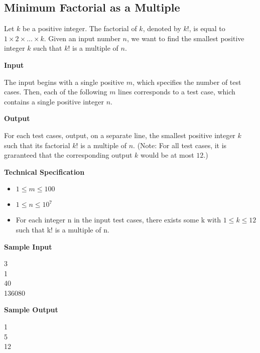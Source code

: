 \subsection{Minimum Factorial as a Multiple}
Let $k$ be a positive integer. The factorial of $k$, denoted by $k!$, is equal to $1 \times 2 \times ... \times k$. Given an input number $n$, we want to find the smallest positive integer $k$ such that $k!$ is a multiple of $n$.

\begin{flushleft}
{\color{red} \textbf{Input}}
\end{flushleft}
The input begins with a single positive $m$, which specifies the number of test cases. Then, each of the following $m$ lines corresponds to a test case, which contains a single positive integer $n$.

\begin{flushleft}
{\color{red} \textbf{Output}}
\end{flushleft}
For each test cases, output, on a separate line, the smallest positive integer $k$ such that its factorial $k!$ is a multiple of $n$. (Note: For all test cases, it is graranteed that the corresponding output $k$ would be at most $12$.)

\begin{flushleft}
{\color{red} \textbf{Technical Specification}}
\end{flushleft}
\begin{itemize}
\item $1 \leq m \leq 100$
\item $1 \leq n \leq 10^7$
\item For each integer n in the input test cases, there exists some k with $1 \leq k \leq 12$ such that k! is a multiple of n.
\end{itemize}

\begin{flushleft}
{\color{red} \textbf{Sample Input}}
\end{flushleft}
\begin{flushleft}
3\\
1\\
40\\
136080\\
\end{flushleft}

\begin{flushleft}
{\color{red} \textbf{Sample Output}}
\end{flushleft}
\begin{flushleft}
1\\
5\\
12\\
\end{flushleft}

\newpage